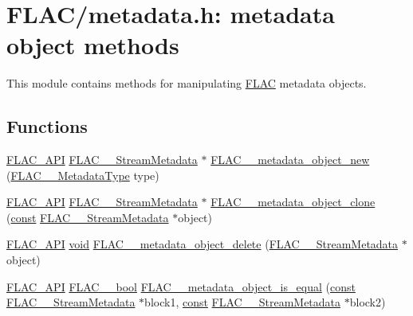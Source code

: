 \hypertarget{group__flac__metadata__object}{}\section{F\+L\+A\+C/metadata.h\+: metadata object methods}
\label{group__flac__metadata__object}


This module contains methods for manipulating \hyperlink{namespace_f_l_a_c}{F\+L\+AC} metadata objects.  


\subsection*{Functions}
\begin{DoxyCompactItemize}
\item 
\hyperlink{group__flac__export_ga56ca07df8a23310707732b1c0007d6f5}{F\+L\+A\+C\+\_\+\+A\+PI} \hyperlink{struct_f_l_a_c_____stream_metadata}{F\+L\+A\+C\+\_\+\+\_\+\+Stream\+Metadata} $\ast$ \hyperlink{group__flac__metadata__object_ga0d21a62648d8c5321b4b47f8ee5a52f0}{F\+L\+A\+C\+\_\+\+\_\+metadata\+\_\+object\+\_\+new} (\hyperlink{group__flac__format_gac71714ba8ddbbd66d26bb78a427fac01}{F\+L\+A\+C\+\_\+\+\_\+\+Metadata\+Type} type)
\item 
\hyperlink{group__flac__export_ga56ca07df8a23310707732b1c0007d6f5}{F\+L\+A\+C\+\_\+\+A\+PI} \hyperlink{struct_f_l_a_c_____stream_metadata}{F\+L\+A\+C\+\_\+\+\_\+\+Stream\+Metadata} $\ast$ \hyperlink{group__flac__metadata__object_ga16b828b246e9af941e3e616e6bcd74c0}{F\+L\+A\+C\+\_\+\+\_\+metadata\+\_\+object\+\_\+clone} (\hyperlink{getopt1_8c_a2c212835823e3c54a8ab6d95c652660e}{const} \hyperlink{struct_f_l_a_c_____stream_metadata}{F\+L\+A\+C\+\_\+\+\_\+\+Stream\+Metadata} $\ast$object)
\item 
\hyperlink{group__flac__export_ga56ca07df8a23310707732b1c0007d6f5}{F\+L\+A\+C\+\_\+\+A\+PI} \hyperlink{sound_8c_ae35f5844602719cf66324f4de2a658b3}{void} \hyperlink{group__flac__metadata__object_ga66bbe27dba68ba77be5af83986a280ea}{F\+L\+A\+C\+\_\+\+\_\+metadata\+\_\+object\+\_\+delete} (\hyperlink{struct_f_l_a_c_____stream_metadata}{F\+L\+A\+C\+\_\+\+\_\+\+Stream\+Metadata} $\ast$object)
\item 
\hyperlink{group__flac__export_ga56ca07df8a23310707732b1c0007d6f5}{F\+L\+A\+C\+\_\+\+A\+PI} \hyperlink{ordinals_8h_a95103469f1cbd78b8cf250194985b34e}{F\+L\+A\+C\+\_\+\+\_\+bool} \hyperlink{group__flac__metadata__object_gac834137d4837c304ca5db4c8407900bb}{F\+L\+A\+C\+\_\+\+\_\+metadata\+\_\+object\+\_\+is\+\_\+equal} (\hyperlink{getopt1_8c_a2c212835823e3c54a8ab6d95c652660e}{const} \hyperlink{struct_f_l_a_c_____stream_metadata}{F\+L\+A\+C\+\_\+\+\_\+\+Stream\+Metadata} $\ast$block1, \hyperlink{getopt1_8c_a2c212835823e3c54a8ab6d95c652660e}{const} \hyperlink{struct_f_l_a_c_____stream_metadata}{F\+L\+A\+C\+\_\+\+\_\+\+Stream\+Metadata} $\ast$block2)

\end{DoxyCompactItemize}
